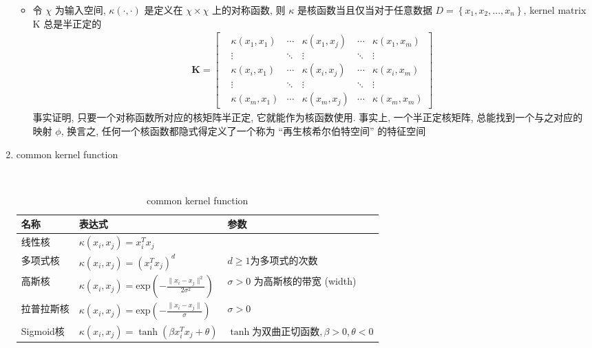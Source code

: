 \documentclass[oneside, 12pt]{ctexbook}
\begin{document}
\begin{enumerate}
\begin{itemize}
							\item 令 $\chi$ 为输入空间, $\kappa(\cdot,\cdot)$ 是定义在 $\chi \times \chi$ 上的对称函数, 则 $\kappa$ 是核函数当且仅当对于任意数据 $D = \left\{ x_1, x_2, ..., x_n \right\}$, kernel matrix K 总是半正定的
							\begin{align}
								\boldsymbol{K} = 
									\begin{bmatrix}
										&\kappa(x_1,x_1) &\cdots &\kappa(x_1,x_j) &\cdots &\kappa(x_1,x_m)\\
										&\vdots & \ddots &\vdots &\ddots &\vdots\\
										&\kappa(x_i,x_1) &\cdots &\kappa(x_i,x_j) &\cdots &\kappa(x_i,x_m)\\
										&\vdots &\ddots &\vdots &\ddots &\vdots\\
										&\kappa(x_m,x_1) &\cdots &\kappa(x_m,x_j) &\cdots &\kappa(x_m,x_m)
									\end{bmatrix}
							\end{align} 
							事实证明, 只要一个对称函数所对应的核矩阵半正定, 它就能作为核函数使用. 事实上, 一个半正定核矩阵, 总能找到一个与之对应的映射 $\phi$, 换言之, 任何一个核函数都隐式得定义了一个称为 “再生核希尔伯特空间” 的特征空间
						\end{itemize}
					
					\item common kernel function
						\begin{table}
							\centering
							\vspace{-1cm}
							\setlength{\belowcaptionskip}{0.2cm}   %
							\renewcommand{\tablename}{Tab}
							\caption{common kernel function}						
							\begin{tabular}{l l l}
								\hline
								名称 &表达式 &参数\\
								\hline
								线性核 &$\kappa(x_i,x_j) = x_i^T x_j$ &\\
								多项式核 &$\kappa(x_i,x_j) = (x_i^T x_j)^d$ &$d \geq 1$为多项式的次数\\
								高斯核 &$\kappa(x_i,x_j) = \text{exp}(-\frac{\parallel x_i - x_j \parallel^2}{2\sigma^2})$ &$\sigma>0$ 为高斯核的带宽 (width)\\ 
								拉普拉斯核 &$\kappa(x_i,x_j) = \text{exp}(-\frac{\parallel x_i - x_j \parallel}{\sigma})$ &$\sigma>0$\\
								Sigmoid核 &$\kappa(x_i,x_j) = \tanh(\beta x_i^T x_j + \theta)$ &$\tanh \text{为双曲正切函数}, \beta>0, \theta<0$\\
								\hline
							\end{tabular}
						\end{table}
					

\end{enumerate}
\end{document}

